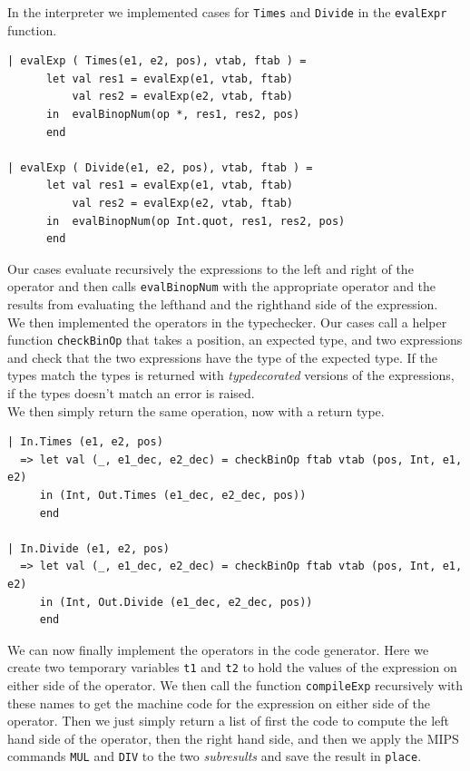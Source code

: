 \documentclass[11pt]{article}
\begin{document}
    In the interpreter we implemented cases for \texttt{Times} and
    \texttt{Divide} in the \texttt{evalExpr} function.

    \begin{lstlisting}[firstnumber=185]
| evalExp ( Times(e1, e2, pos), vtab, ftab ) =
      let val res1 = evalExp(e1, vtab, ftab)
          val res2 = evalExp(e2, vtab, ftab)
      in  evalBinopNum(op *, res1, res2, pos)
      end

| evalExp ( Divide(e1, e2, pos), vtab, ftab ) =
      let val res1 = evalExp(e1, vtab, ftab)
          val res2 = evalExp(e2, vtab, ftab)
      in  evalBinopNum(op Int.quot, res1, res2, pos)
      end
    \end{lstlisting}

    Our cases evaluate recursively the expressions to the left and right of the
    operator and then calls \texttt{evalBinopNum} with the appropriate operator
    and the results from evaluating the lefthand and the righthand side of the
    expression. \\

    We then implemented the operators in the typechecker.  Our cases call a
    helper function \texttt{checkBinOp} that takes a position, an expected type,
    and two expressions and check that the two expressions have the type of the
    expected type.  If the types match the types is returned with
    \textit{typedecorated} versions of the expressions, if the types doesn't
    match an error is raised. \\
    We then simply return the same operation, now with a return type.

    \begin{lstlisting}[firstnumber=104]
| In.Times (e1, e2, pos)
  => let val (_, e1_dec, e2_dec) = checkBinOp ftab vtab (pos, Int, e1, e2)
     in (Int, Out.Times (e1_dec, e2_dec, pos))
     end

| In.Divide (e1, e2, pos)
  => let val (_, e1_dec, e2_dec) = checkBinOp ftab vtab (pos, Int, e1, e2)
     in (Int, Out.Divide (e1_dec, e2_dec, pos))
     end
    \end{lstlisting}

    We can now finally implement the operators in the code generator.  Here we
    create two temporary variables \texttt{t1} and \texttt{t2} to hold the
    values of the expression on either side of the operator.  We then call the
    function \texttt{compileExp} recursively with these names to get the machine
    code for the expression on either side of the operator.  Then we just simply
    return a list of first the code to compute the left hand side of the
    operator, then the right hand side, and then we apply the MIPS commands
    \texttt{MUL} and \texttt{DIV} to the two \textit{subresults} and save the
    result in \texttt{place}.
\end{document}
